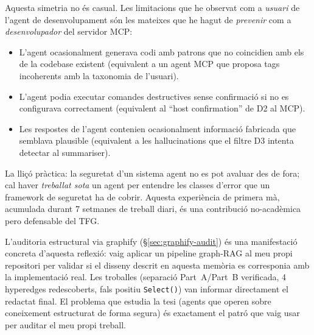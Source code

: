 Aquesta simetria no és casual. Les limitacions que he observat com a \emph{usuari} de l'agent de desenvolupament són les mateixes que he hagut de \emph{prevenir} com a \emph{desenvolupador} del servidor MCP:

\begin{itemize}
    \item L'agent ocasionalment generava codi amb patrons que no coincidien amb els de la codebase existent (equivalent a un agent MCP que proposa tags incoherents amb la taxonomia de l'usuari).
    \item L'agent podia executar comandes destructives sense confirmació si no es configurava correctament (equivalent al ``host confirmation'' de D2 al MCP).
    \item Les respostes de l'agent contenien ocasionalment informació fabricada que semblava plausible (equivalent a les hallucinations que el filtre D3 intenta detectar al summariser).
\end{itemize}

La lliçó pràctica: la seguretat d'un sistema agent no es pot avaluar des de fora; cal haver \emph{treballat sota} un agent per entendre les classes d'error que un framework de seguretat ha de cobrir. Aquesta experiència de primera mà, acumulada durant 7 setmanes de treball diari, és una contribució no-acadèmica pero defensable del TFG.

L'auditoria estructural via graphify (\S\ref{sec:graphify-audit}) és una manifestació concreta d'aquesta reflexió: vaig aplicar un pipeline graph-RAG al meu propi repositori per validar si el disseny descrit en aquesta memòria es corresponia amb la implementació real. Les troballes (separació Part~A/Part~B verificada, 4 hyperedges redescoberts, fals positiu \texttt{Select()}) van informar directament el redactat final. El problema que estudia la tesi (agents que operen sobre coneixement estructurat de forma segura) és exactament el patró que vaig usar per auditar el meu propi treball.
